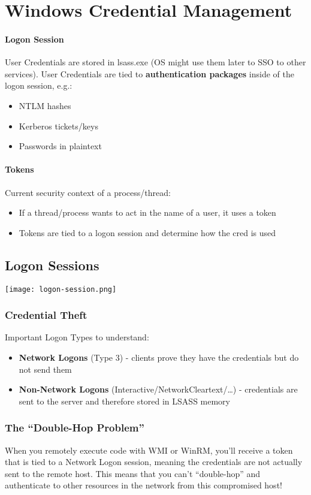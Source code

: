 \section{Windows Credential Management}
\paragraph{Logon Session}
User Credentials are stored in lsass.exe (OS might use them later to SSO to other services).
User Credentials are tied to \textbf{authentication packages} inside of the logon session, e.g.:
\begin{itemize}
  \item NTLM hashes
  \item Kerberos tickets/keys
  \item Passwords in plaintext
\end{itemize}

\paragraph{Tokens}
Current security context of a process/thread:
\begin{itemize}
  \item If a thread/process wants to act in the name of a user, it uses a token
  \item Tokens are tied to a logon session and determine how the cred is used
\end{itemize}

\subsection{Logon Sessions}
\texttt{[image: logon-session.png]}

\subsubsection{Credential Theft}
Important Logon Types to understand:
\begin{itemize}
  \item \textbf{Network Logons} (Type 3) - clients prove they have the credentials but do not send them
  \item \textbf{Non-Network Logons} (Interactive/NetworkCleartext/\dots) - credentials are sent to the server and therefore stored in LSASS memory
\end{itemize}

\subsubsection{The ``Double-Hop Problem''}
When you remotely execute code with WMI or WinRM, you'll receive a token that is tied to a Network Logon session, meaning the credentials are not actually sent to the remote host. This means that you can't ``double-hop'' and authenticate to other resources in the network from this compromised host!

